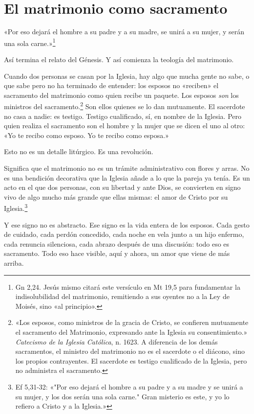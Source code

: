 \section{El matrimonio como sacramento}

«Por eso dejará el hombre a su padre y a su madre, se unirá a su mujer, y serán una sola carne.»\footnote{Gn 2,24. Jesús mismo citará este versículo en Mt 19,5 para fundamentar la indisolubilidad del matrimonio, remitiendo a sus oyentes no a la Ley de Moisés, sino «al principio».}

Así termina el relato del Génesis. Y así comienza la teología del matrimonio.

Cuando dos personas se casan por la Iglesia, hay algo que mucha gente no sabe, o que sabe pero no ha terminado de entender: los esposos no «reciben» el sacramento del matrimonio como quien recibe un paquete. Los esposos \emph{son} los ministros del sacramento.\footnote{«Los esposos, como ministros de la gracia de Cristo, se confieren mutuamente el sacramento del Matrimonio, expresando ante la Iglesia su consentimiento.» \textit{Catecismo de la Iglesia Católica}, n. 1623. A diferencia de los demás sacramentos, el ministro del matrimonio no es el sacerdote o el diácono, sino los propios contrayentes. El sacerdote es testigo cualificado de la Iglesia, pero no administra el sacramento.} Son ellos quienes se lo dan mutuamente. El sacerdote no casa a nadie: es testigo. Testigo cualificado, sí, en nombre de la Iglesia. Pero quien realiza el sacramento son el hombre y la mujer que se dicen el uno al otro: «Yo te recibo como esposo. Yo te recibo como esposa.»

Esto no es un detalle litúrgico. Es una revolución.

Significa que el matrimonio no es un trámite administrativo con flores y arras. No es una bendición decorativa que la Iglesia añade a lo que la pareja ya tenía. Es un acto en el que dos personas, con su libertad y ante Dios, se convierten en signo vivo de algo mucho más grande que ellas mismas: el amor de Cristo por su Iglesia.\footnote{Ef 5,31-32: «"Por eso dejará el hombre a su padre y a su madre y se unirá a su mujer, y los dos serán una sola carne." Gran misterio es este, y yo lo refiero a Cristo y a la Iglesia.»}

Y ese signo no es abstracto. Ese signo es la vida entera de los esposos. Cada gesto de cuidado, cada perdón concedido, cada noche en vela junto a un hijo enfermo, cada renuncia silenciosa, cada abrazo después de una discusión: todo eso es sacramento. Todo eso hace visible, aquí y ahora, un amor que viene de más arriba.

